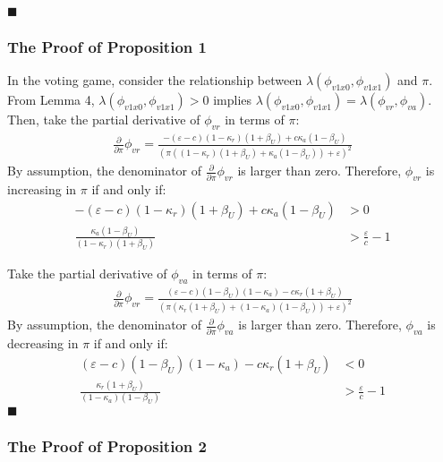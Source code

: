 \hfill $\blacksquare$

\subsubsection{The Proof of Proposition 1}

\par In the voting game, consider the relationship between $\lambda(\phi_{v1x0},\phi_{v1x1})$ and $\pi$. From Lemma 4, $\lambda(\phi_{v1x0},\phi_{v1x1})>0$ implies $\lambda(\phi_{v1x0},\phi_{v1x1})=\lambda(\phi_{vr},\phi_{va})$. Then, take the partial derivative of $\phi_{vr}$ in terms of $\pi$:
\begin{align*}
\frac{\partial}{\partial \pi} \phi_{vr} = \frac{-(\varepsilon-c)(1-\kappa_r)(1+\beta_U) + c\kappa_a(1-\beta_U)}{\left(\pi\left(\left(1-\kappa_r\right)\left(1+\beta_U\right)+\kappa_a\left(1-\beta_U\right)\right)+\varepsilon\right)^2}
\end{align*}
\noindent By assumption, the denominator of $\frac{\partial}{\partial \pi} \phi_{vr}$ is larger than zero. Therefore, $\phi_{vr}$ is increasing in $\pi$ if and only if:
\begin{align*}
-(\varepsilon-c)(1-\kappa_r)(1+\beta_U) + c\kappa_a(1-\beta_U) &> 0 \\
\frac{\kappa_a(1-\beta_U)}{(1-\kappa_r)(1+\beta_U)} &> \frac{\varepsilon}{c} - 1
\end{align*}

\par Take the partial derivative of $\phi_{va}$ in terms of $\pi$:
\begin{align*}
\frac{\partial}{\partial \pi} \phi_{vr} = \frac{(\varepsilon-c)(1-\beta_U)(1-\kappa_a) - c\kappa_r(1+\beta_U)}{\left(\pi\left(\kappa_r\left(1+\beta_U\right)+\left(1-\kappa_a\right)\left(1-\beta_U\right)\right)+\varepsilon\right)^2}
\end{align*}
\noindent By assumption, the denominator of $\frac{\partial}{\partial \pi} \phi_{va}$ is larger than zero. Therefore, $\phi_{va}$ is decreasing in $\pi$ if and only if:
\begin{align*}
(\varepsilon-c)(1-\beta_U)(1-\kappa_a) - c\kappa_r(1+\beta_U) &< 0 \\
\frac{\kappa_r(1+\beta_U)}{(1-\kappa_a)(1-\beta_U)} &> \frac{\varepsilon}{c} - 1
\end{align*}
\hfill $\blacksquare$

\subsubsection{The Proof of Proposition 2}

